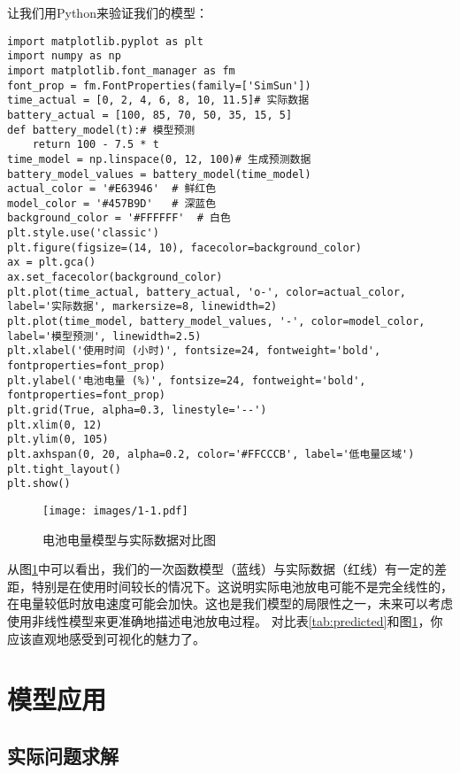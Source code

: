 \begin{codebox}[title=Python验证代码]
让我们用Python来验证我们的模型：
\begin{verbatim}
import matplotlib.pyplot as plt
import numpy as np
import matplotlib.font_manager as fm
font_prop = fm.FontProperties(family=['SimSun'])
time_actual = [0, 2, 4, 6, 8, 10, 11.5]# 实际数据
battery_actual = [100, 85, 70, 50, 35, 15, 5]
def battery_model(t):# 模型预测
    return 100 - 7.5 * t
time_model = np.linspace(0, 12, 100)# 生成预测数据
battery_model_values = battery_model(time_model)
actual_color = '#E63946'  # 鲜红色
model_color = '#457B9D'   # 深蓝色
background_color = '#FFFFFF'  # 白色
plt.style.use('classic')  
plt.figure(figsize=(14, 10), facecolor=background_color)
ax = plt.gca()
ax.set_facecolor(background_color)
plt.plot(time_actual, battery_actual, 'o-', color=actual_color, label='实际数据', markersize=8, linewidth=2)
plt.plot(time_model, battery_model_values, '-', color=model_color, label='模型预测', linewidth=2.5)
plt.xlabel('使用时间 (小时)', fontsize=24, fontweight='bold', fontproperties=font_prop)
plt.ylabel('电池电量 (%)', fontsize=24, fontweight='bold', fontproperties=font_prop)
plt.grid(True, alpha=0.3, linestyle='--')
plt.xlim(0, 12)
plt.ylim(0, 105)
plt.axhspan(0, 20, alpha=0.2, color='#FFCCCB', label='低电量区域')
plt.tight_layout()
plt.show()
\end{verbatim}
\end{codebox}

\begin{figure}[htbp]
    \centering
    \texttt{[image: images/1-1.pdf]}
    \caption{电池电量模型与实际数据对比图}
    \label{fig:battery-model}
\end{figure}

从图\ref{fig:battery-model}中可以看出，我们的一次函数模型（蓝线）与实际数据（红线）有一定的差距，特别是在使用时间较长的情况下。这说明实际电池放电可能不是完全线性的，在电量较低时放电速度可能会加快。这也是我们模型的局限性之一，未来可以考虑使用非线性模型来更准确地描述电池放电过程。
对比表\ref{tab:predicted}和图\ref{fig:battery-model}，你应该直观地感受到可视化的魅力了。

\section{模型应用}\label{sec:model-application}

\subsection{实际问题求解}

